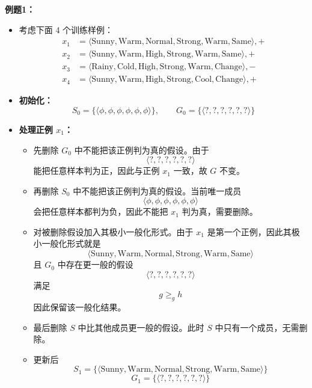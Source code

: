 \documentclass[../main.tex]{subfiles}
\begin{document}
\begin{enumerate}
	\textbf{例题1：}

    {\small\kaishu
    \begin{itemize}
        \item 考虑下面 4 个训练样例：
        \[
        \begin{aligned}
            x_1 &= \langle \text{Sunny}, \text{Warm}, \text{Normal}, \text{Strong}, \text{Warm}, \text{Same} \rangle, + \\
            x_2 &= \langle \text{Sunny}, \text{Warm}, \text{High}, \text{Strong}, \text{Warm}, \text{Same} \rangle, + \\
            x_3 &= \langle \text{Rainy}, \text{Cold}, \text{High}, \text{Strong}, \text{Warm}, \text{Change} \rangle, - \\
            x_4 &= \langle \text{Sunny}, \text{Warm}, \text{High}, \text{Strong}, \text{Cool}, \text{Change} \rangle, +
        \end{aligned}
        \]

        \item \textbf{初始化：}
        \[
            S_0=\{\langle \phi,\phi,\phi,\phi,\phi,\phi \rangle\},\qquad
            G_0=\{\langle ?, ?, ?, ?, ?, ? \rangle\}
        \]

        \item \textbf{处理正例 $x_1$：}
        \begin{itemize}
            \item 先删除 $G_0$ 中不能把该正例判为真的假设。由于
            \[
                \langle ?, ?, ?, ?, ?, ? \rangle
            \]
            能把任意样本判为正，因此与正例 $x_1$ 一致，故 $G$ 不变。
            \item 再删除 $S_0$ 中不能把该正例判为真的假设。当前唯一成员
            \[
                \langle \phi,\phi,\phi,\phi,\phi,\phi \rangle
            \]
            会把任意样本都判为负，因此不能把 $x_1$ 判为真，需要删除。
            \item 对被删除假设加入其极小一般化形式。由于 $x_1$ 是第一个正例，因此其极小一般化形式就是
            \[
                \langle \text{Sunny}, \text{Warm}, \text{Normal}, \text{Strong}, \text{Warm}, \text{Same} \rangle
            \]
            且 $G_0$ 中存在更一般的假设
            \[
                \langle ?, ?, ?, ?, ?, ? \rangle
            \]
            满足
            \[
                g \geq_g h
            \]
            因此保留该一般化结果。
            \item 最后删除 $S$ 中比其他成员更一般的假设。此时 $S$ 中只有一个成员，无需删除。
            \item 更新后
            \[
                S_1=\{\langle \text{Sunny}, \text{Warm}, \text{Normal}, \text{Strong}, \text{Warm}, \text{Same} \rangle\}
            \]
            \[
                G_1=\{\langle ?, ?, ?, ?, ?, ? \rangle\}
            \]
        \end{itemize}


\end{itemize}}
\end{enumerate}
\end{document}
